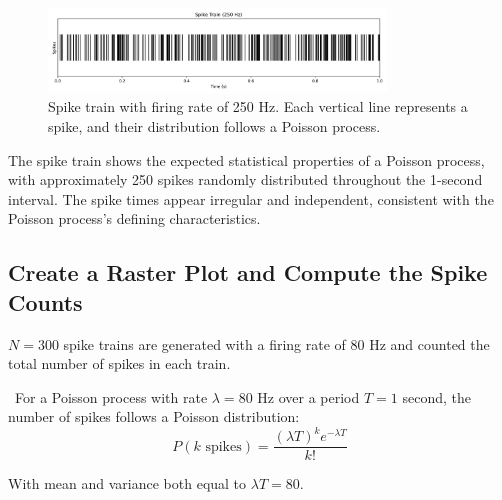 \documentclass{article}
\begin{document}
\begin{figure}[H]
\centering
\includegraphics[width=0.8\textwidth]{Fig1.png}
\caption{Spike train with firing rate of 250 Hz. Each vertical line represents a spike, and their distribution follows a Poisson process.}
\label{fig:spike_train}
\end{figure}

The spike train shows the expected statistical properties of a Poisson process, with approximately 250 spikes randomly distributed throughout the 1-second interval. The spike times appear irregular and independent, consistent with the Poisson process's defining characteristics.

\subsection{Create a Raster Plot and Compute the Spike Counts}

$N = 300$ spike trains are generated with a firing rate of 80 Hz and counted the total number of spikes in each train.


\
For a Poisson process with rate $\lambda = 80$ Hz over a period $T = 1$ second, the number of spikes follows a Poisson distribution:
\begin{equation}
    P(k \text{ spikes}) = \frac{(\lambda T)^k e^{-\lambda T}}{k!}
\end{equation}

With mean and variance both equal to $\lambda T = 80$.
\end{document}
